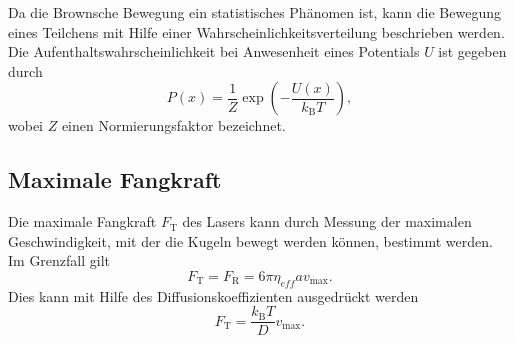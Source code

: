 Da die Brownsche Bewegung ein statistisches Phänomen ist, kann die Bewegung eines Teilchens mit Hilfe einer Wahrscheinlichkeitsverteilung beschrieben werden. Die Aufenthaltswahrscheinlichkeit bei Anwesenheit eines Potentials $U$ ist gegeben durch \cite{Litmap}
\begin{equation}
 P(x) = \frac{1}{Z}\exp\left(-\frac{U(x)}{k_{\textrm{B}}T}\right),
\end{equation}
wobei $Z$ einen Normierungsfaktor bezeichnet.

\subsection{Maximale Fangkraft}

Die maximale Fangkraft $F_{\textrm{T}}$ des Lasers kann durch Messung der maximalen Geschwindigkeit, mit der die Kugeln bewegt werden können, bestimmt werden. Im Grenzfall gilt
\begin{equation}
 F_{\textrm{T}} = F_{\textrm{R}} = 6\pi\eta_{eff}av_{\textrm{max}}.
\end{equation}
Dies kann mit Hilfe des Diffusionskoeffizienten ausgedrückt werden
\begin{equation}
 F_{\textrm{T}} = \frac{k_{\textrm{B}}T}{D} v_{\textrm{max}}.
\end{equation}




